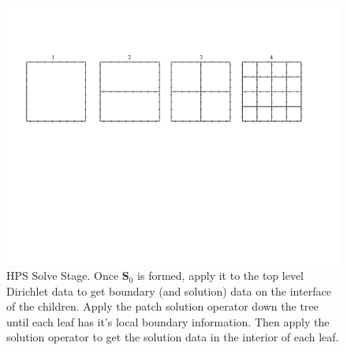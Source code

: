 \begin{figure}
    \centering
    \includegraphics[width=\columnwidth]{figures/solve_figure.pdf}
    \caption{HPS Solve Stage. Once $\textbf{S}_0$ is formed, apply it to the top level Dirichlet data to get boundary (and solution) data on the interface of the children. Apply the patch solution operator down the tree until each leaf has it's local boundary information. Then apply the solution operator to get the solution data in the interior of each leaf.}
    \label{fig:solve}
\end{figure}
